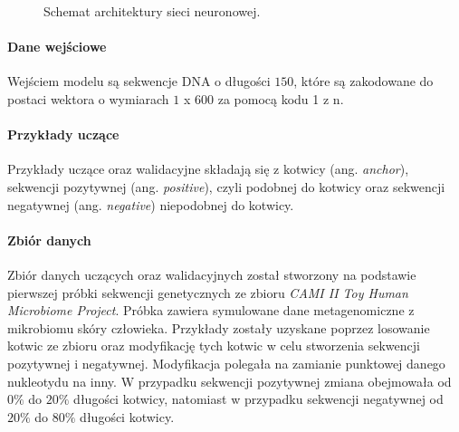 \documentclass{article}
\begin{document}
{\begin{figure}[!htb]
\begin{center}
{

                        }
                    \end{center}
                    \caption{
                        Schemat architektury sieci neuronowej.
                    }\label{Picture:NeuralModel}
                \end{figure}

            \paragraph{Dane wejściowe}
                Wejściem modelu są sekwencje DNA o długości $150$, które są zakodowane do postaci wektora o wymiarach $1$ x $600$ za pomocą kodu 1 z n\cite{HarrisDavid:2007}.

            \paragraph{Przykłady uczące}
                Przykłady uczące oraz walidacyjne składają się z kotwicy (ang. \textit{anchor}), sekwencji pozytywnej (ang. \textit{positive}), czyli podobnej do kotwicy oraz sekwencji negatywnej (ang. \textit{negative}) niepodobnej do kotwicy.

            \paragraph{Zbiór danych}
                Zbiór danych uczących oraz walidacyjnych został stworzony na podstawie pierwszej próbki sekwencji genetycznych ze zbioru \textit{CAMI II Toy Human Microbiome Project}\cite{Fritz:2019}. Próbka zawiera symulowane dane metagenomiczne z mikrobiomu skóry człowieka. Przykłady zostały uzyskane poprzez losowanie kotwic ze zbioru oraz modyfikację tych kotwic w celu stworzenia sekwencji pozytywnej i negatywnej. Modyfikacja polegała na zamianie punktowej danego nukleotydu na inny. W przypadku sekwencji pozytywnej zmiana obejmowała od $0\%$ do $20\%$ długości kotwicy, natomiast w przypadku sekwencji negatywnej od $20\%$ do $80\%$ długości kotwicy.

}
\end{document}
